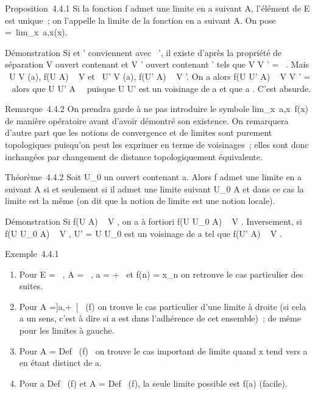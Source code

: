 \documentclass[]{article}
\begin{document}
Proposition~4.4.1 Si la fonction f admet une limite en a suivant A,
l'élément \ell de E est unique~; on l'appelle la limite de la fonction en a
suivant A. On pose \ell =\
lim_x\rightarrow~a,x\inAf(x).

Démonstration Si \ell et \ell' conviennent avec \ell\neq~\ell', il existe d'après la
propriété de séparation V ouvert contenant \ell et V ' ouvert contenant \ell'
tels que V \bigcap V ' = \varnothing~. Mais \exists~U \in V (a), f(U \bigcap
A) \subset~ V et \exists~U' \in V (a), f(U' \bigcap A) \subset~ V '. On a
alors f(U \bigcap U' \bigcap A) \subset~ V \bigcap V ' = \varnothing~ alors que U \bigcap U' \bigcap
A\neq~\varnothing~ puisque U \bigcap U' est un voisinage de a et
que a \in\overlineA. C'est absurde.

Remarque~4.4.2 On prendra garde à ne pas introduire le symbole
lim_x\rightarrow~a,x\inA~f(x) de manière opératoire
avant d'avoir démontré son existence. On remarquera d'autre part que les
notions de convergence et de limites sont purement topologiques
puisqu'on peut les exprimer en terme de voisinages~; elles sont donc
inchangées par changement de distance topologiquement équivalente.

Théorème~4.4.2 Soit U_0 un ouvert contenant a. Alors f admet
une limite en a suivant A si et seulement si il admet une limite suivant
U_0 \bigcap A et dans ce cas la limite est la même (on dit que la
notion de limite est une notion locale).

Démonstration Si f(U \bigcap A) \subset~ V , on a à fortiori f(U \bigcap U_0 \bigcap A)
\subset~ V . Inversement, si f(U \bigcap U_0 \bigcap A) \subset~ V , U' = U \bigcap
U_0 est un voisinage de a tel que f(U' \bigcap A) \subset~ V .

Exemple~4.4.1

\begin{enumerate}
\itemsep1pt\parskip0pt
\item
  Pour E = \overline{}~, A = ~, a = +\infty~ et f(n) =
  x_n on retrouve le cas particulier des suites.
\item
  Pour A =]a,+\infty~[\bigcapDef~ (f) on trouve le cas
  particulier d'une limite à droite (si cela a un sens, c'est à dire si
  a est dans l'adhérence de cet ensemble)~; de même pour les limites à
  gauche.
\item
  Pour A = Def~ (f)
  \diagdown\a\ on trouve le cas important de
  limite quand x tend vers a en étant distinct de a.
\item
  Pour a \in Def~ (f) et A
  = Def~ (f), la seule limite possible est f(a)
  (facile).
\end{enumerate}
\end{document}
